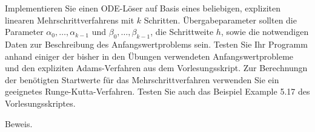 \begin{exercise}
Implementieren Sie einen ODE-Löser auf Basis eines beliebigen, expliziten linearen
Mehrschrittverfahrens mit $k$ Schritten. Übergabeparameter sollten die Parameter
$\alpha_0,\dots,\alpha_{k-1}$ und $\beta_0,\dots,\beta_{k-1}$, die Schrittweite
$h$, sowie die notwendigen Daten zur Beschreibung des Anfangswertproblems sein.
Testen Sie Ihr Programm anhand einiger der bisher in den Übungen verwendeten
Anfangswertprobleme und den expliziten Adams-Verfahren aus dem Vorlesungsskript.
Zur Berechnungn der benötigten Startwerte für das Mehrschrittverfahren verwenden
Sie ein geeignetes Runge-Kutta-Verfahren. Testen Sie auch das Beispiel Example 5.17
des Vorlesungsskriptes.
\end{exercise}
\begin{solution}
Beweis.
\end{solution}
